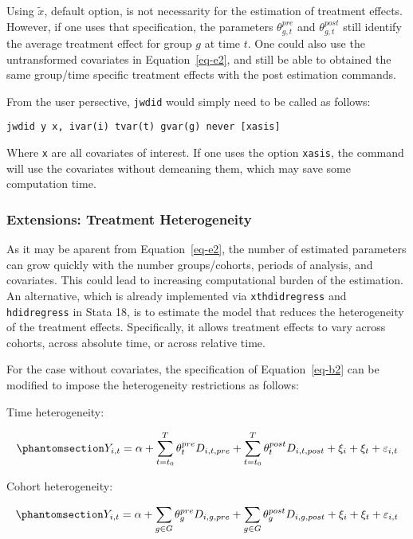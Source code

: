 \documentclass[
  letterpaper,
  DIV=11,
  numbers=noendperiod]{scrartcl}
\begin{document}
Using \(\tilde x\), default option, is not necessarity for the
estimation of treatment effects. However, if one uses that
specification, the parameters \(\theta^{pre}_{g,t}\) and
\(\theta^{post}_{g,t}\) still identify the average treatment effect for
group \(g\) at time \(t\). One could also use the untransformed
covariates in Equation~\ref{eq-e2}, and still be able to obtained the
same group/time specific treatment effects with the post estimation
commands.

From the user persective, \texttt{jwdid} would simply need to be called
as follows:

\texttt{jwdid\ y\ x,\ ivar(i)\ tvar(t)\ gvar(g)\ never\ {[}xasis{]}}

Where \texttt{x} are all covariates of interest. If one uses the option
\texttt{xasis}, the command will use the covariates without demeaning
them, which may save some computation time.

\subsubsection{Extensions: Treatment Heterogeneity}\label{sec-het}

As it may be aparent from Equation~\ref{eq-e2}, the number of estimated
parameters can grow quickly with the number groups/cohorts, periods of
analysis, and covariates. This could lead to increasing computational
burden of the estimation. An alternative, which is already implemented
via \texttt{xthdidregress} and \texttt{hdidregress} in Stata 18, is to
estimate the model that reduces the heterogeneity of the treatment
effects. Specifically, it allows treatment effects to vary across
cohorts, across absolute time, or across relative time.

For the case without covariates, the specification of
Equation~\ref{eq-b2} can be modified to impose the heterogeneity
restrictions as follows:

Time heterogeneity:

\begin{equation}\phantomsection\label{eq-ht1}{Y_{i,t} = \alpha +  \sum_{t=t_0}^T \theta^{pre}_{t} D_{i,t,pre} + \sum_{t=t_0}^T \theta^{post}_{t}  D_{i,t,post}+ \xi_i + \xi_t + \varepsilon_{i,t}
}\end{equation}

Cohort heterogeneity:

\begin{equation}\phantomsection\label{eq-ht2}{Y_{i,t} = \alpha +  \sum_{g\in G} \theta^{pre}_{g}  D_{i,g,pre}+ \sum_{g\in G} \theta^{post}_{g} D_{i,g,post} + \xi_i + \xi_t+\varepsilon_{i,t}
}\end{equation}
\end{document}
